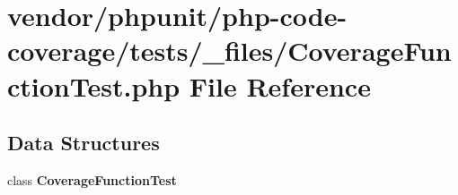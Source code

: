 \section{vendor/phpunit/php-\/code-\/coverage/tests/\+\_\+files/\+Coverage\+Function\+Test.php File Reference}
\label{php-code-coverage_2tests_2__files_2_coverage_function_test_8php}
\subsection*{Data Structures}
\begin{DoxyCompactItemize}
\item 
class {\bf Coverage\+Function\+Test}
\end{DoxyCompactItemize}
